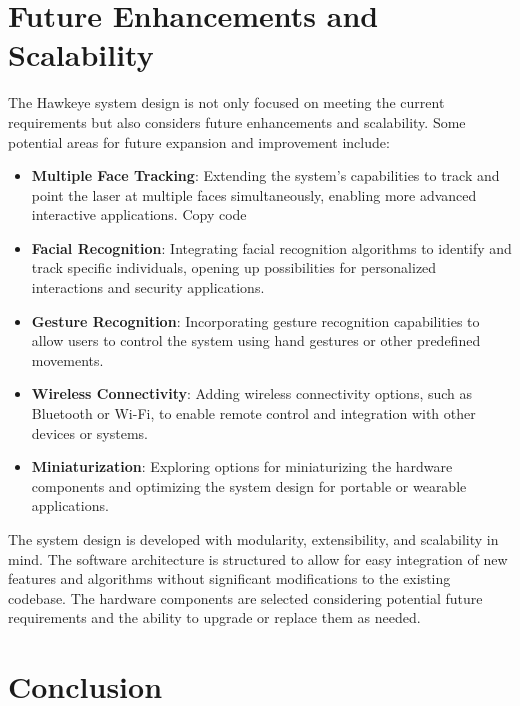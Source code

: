 \documentclass[a4paper,11pt]{article}%
\begin{document}
\section{Future Enhancements and Scalability}
The Hawkeye system design is not only focused on meeting the current requirements but also considers future enhancements and scalability. Some potential areas for future expansion and improvement include:
\begin{itemize}
    \item \textbf{Multiple Face Tracking}: Extending the system's capabilities to track and point the laser at multiple faces simultaneously, enabling more advanced interactive applications.
          Copy code\item \textbf{Facial Recognition}: Integrating facial recognition algorithms to identify and track specific individuals, opening up possibilities for personalized interactions and security applications.

    \item \textbf{Gesture Recognition}: Incorporating gesture recognition capabilities to allow users to control the system using hand gestures or other predefined movements.

    \item \textbf{Wireless Connectivity}: Adding wireless connectivity options, such as Bluetooth or Wi-Fi, to enable remote control and integration with other devices or systems.

    \item \textbf{Miniaturization}: Exploring options for miniaturizing the hardware components and optimizing the system design for portable or wearable applications.
\end{itemize}

The system design is developed with modularity, extensibility, and scalability in mind. The software architecture is structured to allow for easy integration of new features and algorithms without significant modifications to the existing codebase. The hardware components are selected considering potential future requirements and the ability to upgrade or replace them as needed.






\section{Conclusion}
\end{document}
